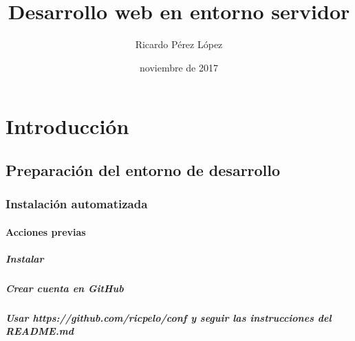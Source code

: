 \documentclass[a4paper,12pt,spanish]{sphinxmanual}
\title{Desarrollo web en entorno servidor}
\date{noviembre de 2017}
\author{Ricardo Pérez López}
\begin{document}
\maketitle
\sphinxtableofcontents
{}\label{\detokenize{index_latex::doc}}



\part{Introducción}
\label{\detokenize{introduccion:introduccion}}\label{\detokenize{introduccion:desarrollo-web-en-entorno-servidor}}\label{\detokenize{introduccion::doc}}

\chapter{Preparación del entorno de desarrollo}
\label{\detokenize{introduccion:preparacion-del-entorno-de-desarrollo}}

\section{Instalación automatizada}
\label{\detokenize{introduccion:instalacion-automatizada}}

\subsection{Acciones previas}
\label{\detokenize{introduccion:acciones-previas}}

\subsubsection{Instalar }
\label{\detokenize{introduccion:instalar-git}}

\subsubsection{Crear cuenta en GitHub}
\label{\detokenize{introduccion:crear-cuenta-en-github}}

\subsubsection{Usar https://github.com/ricpelo/conf y seguir las instrucciones del README.md}
\label{\detokenize{introduccion:usar-https-github-com-ricpelo-conf-y-seguir-las-instrucciones-del-readme-md}}
\end{document}
